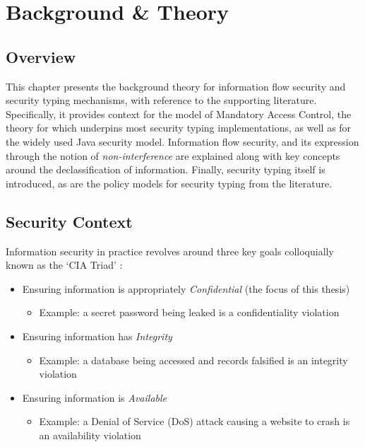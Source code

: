 \chapter{Background \& Theory} \label{chap_theory}

\section{Overview}

This chapter presents the background theory for information flow security and security typing mechanisms, with reference to the supporting literature. Specifically, it provides context for the model of Mandatory Access Control, the theory for which underpins most security typing implementations, as well as for the widely used Java security model. Information flow security, and its expression through the notion of \textit{non-interference} are explained along with key concepts around the declassification of information. Finally, security typing itself is introduced, as are the policy models for security typing from the literature.

\newpage

\section{Security Context}

Information security in practice revolves around three key goals colloquially known as the `CIA Triad' \cite{krutz2010cloudsec}:

\begin{itemize}
	\item Ensuring information is appropriately \textit{Confidential} (the focus of this thesis)

	\begin{itemize}
		\item Example: a secret password being leaked is a confidentiality violation
	\end{itemize}
	
	\item Ensuring information has \textit{Integrity}
	
	\begin{itemize}
		\item Example: a database being accessed and records falsified is an integrity violation
	\end{itemize}
	
	\item Ensuring information is \textit{Available}
	
	\begin{itemize}
		\item Example: a Denial of Service (DoS) attack causing a website to crash is an availability violation
	\end{itemize}

\end{itemize}

